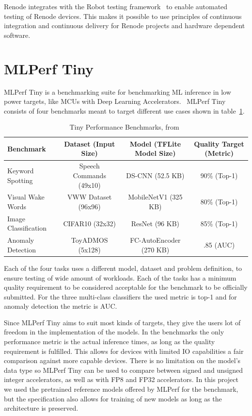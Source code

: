 \documentclass[12pt,a4paper,english
]{tunithesis}
\begin{document}
Renode integrates with the Robot testing framework~\cite{robotframework} to enable automated testing of Renode devices. This makes it possible to use principles of continuous integration and continuous delivery for Renode projects and hardware dependent software.

\section{MLPerf Tiny}
\label{sec:tinyperf}
MLPerf Tiny is a benchmarking suite for benchmarking ML inference in low power targets, like MCUs with Deep Learning Accelerators.~\parencite{tinyperf}
MLPerf Tiny consists of four benchmarks meant to target different use cases shown in table~\ref{tab:tinyperf}.

\begin{table}[ht]
\centering
\caption{Tiny Performance Benchmarks, from~\parencite{tinyperf}}
\begin{adjustbox}{max width=\textwidth}
\begin{tabular}{lccc}
  \toprule
  \textbf{Benchmark} & \textbf{Dataset (Input Size)} & \textbf{Model (TFLite Model Size)} & \textbf{Quality Target (Metric)} \\
  \midrule
  Keyword Spotting & Speech Commands (49x10) & DS-CNN (52.5 KB) & 90\% (Top-1) \\
  Visual Wake Words & VWW Dataset (96x96)  & MobileNetV1 (325 KB) & 80\% (Top-1) \\
  Image Classification & CIFAR10 (32x32) & ResNet (96 KB) & 85\% (Top-1) \\
  Anomaly Detection & ToyADMOS (5x128)  & FC-AutoEncoder (270 KB) & .85 (AUC) \\
  \bottomrule
\end{tabular}
\end{adjustbox}
\label{tab:tinyperf}
\end{table}
Each of the four tasks uses a different model, dataset and problem definition, to ensure testing of wide amount of workloads. Each of the tasks has a minimum quality requirement to be considered acceptable for the benchmark to be officially submitted. For the three multi-class classifiers the used metric is top-1 and for anomaly detection the metric is AUC.

Since MLPerf Tiny aims to suit most kinds of targets, they give the users lot of freedom in the implementation of the models. In the benchmarks the only performance metric is the actual inference times, as long as the quality requirement is fulfilled. This allows for devices with limited IO capabilities a fair comparison against more capable devices. There is no limitation on the model's data type so MLPerf Tiny can be used to compare between signed and unsigned integer accelerators, as well as with FP8 and FP32 accelerators.
In this project we used the pretrained reference models offered by MLPerf for the benchmark, but the specification also allows for training of new models as long as the architecture is preserved.
\end{document}

